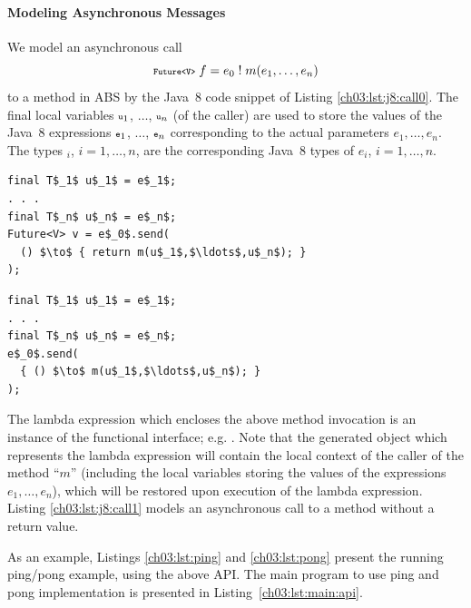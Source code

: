 \paragraph{Modeling Asynchronous Messages} 
\label{ch03:par:asynchronous_messages}
We model an asynchronous call 
$$
{\scriptsize\texttt{Future<V>}} \; f = e_0\; !\; m(e_1,\ldots,e_n)
$$
to a method in ABS by the Java~8 code snippet of Listing \ref{ch03:lst:j8:call0}.
The final local variables ${\scriptsize\texttt{u}}_1$, $\ldots$, ${\scriptsize\texttt{u}}_n$ (of the caller) are used to store the values of
the Java~8 expressions ${\scriptsize\texttt{e}}_1$, $\ldots$, ${\scriptsize\texttt{e}}_n$ corresponding to the actual parameters  $e_1,\ldots,e_n$.
The types $_i$, $i=1,\ldots,n$,  are the corresponding Java~8 types of  $e_i$, $i=1,\ldots,n$.
\begin{center}
\begin{minipage}[t]{0.48\textwidth}
\begin{lstlisting}[mathescape,caption=Async messages with futures,label=ch03:lst:j8:call0]
final T$_1$ u$_1$ = e$_1$;
. . . 
final T$_n$ u$_n$ = e$_n$;
Future<V> v = e$_0$.send(
  () $\to$ { return m(u$_1$,$\ldots$,u$_n$); }
);
\end{lstlisting}
\end{minipage}
\hfill
\begin{minipage}[t]{0.48\textwidth}
\begin{lstlisting}[mathescape,caption=Async messages w/o futures,label=ch03:lst:j8:call1]
final T$_1$ u$_1$ = e$_1$;
. . . 
final T$_n$ u$_n$ = e$_n$;
e$_0$.send(
  { () $\to$ m(u$_1$,$\ldots$,u$_n$); }
);
\end{lstlisting}
\end{minipage}
\end{center}

The lambda expression  which encloses the above method invocation  is an instance of the  functional interface; e.g. .
Note that the generated object which  represents the  lambda expression will contain the local context of the caller of the method ``$m$'' (including the local variables storing the values of the expressions $e_1,\ldots,e_n$), which will be restored upon execution of the lambda expression. 
Listing \ref{ch03:lst:j8:call1} models an asynchronous call to a method without a return value.

As an example, Listings \ref{ch03:lst:ping} and \ref{ch03:lst:pong} present the running ping/pong example, using the above API.
The main program to use ping and pong implementation is presented in Listing~\ref{ch03:lst:main:api}.

